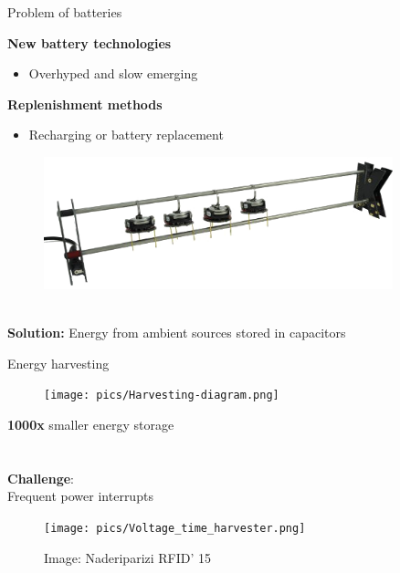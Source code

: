 \documentclass{beamer}
\begin{document}
\begin{frame}{Problem of batteries}
	\begin{minipage}{0.54\textwidth}
		\textbf{New battery technologies}
		\begin{itemize}
			\item Overhyped and slow emerging
		\end{itemize}
		\vspace{0.5em}
		\textbf{Replenishment methods}
		\begin{itemize}
			\item Recharging or battery replacement
		\end{itemize}
	\end{minipage}
	\begin{minipage}{0.45\textwidth}\raggedleft
		\begin{figure}
			\centering
			\includegraphics[width=0.9\textwidth]{pics/Kilobot_charger_with_robots1-495x188.png}
		\end{figure}
	\end{minipage} \\
	\vspace{3em}
	\pause
	\textbf{Solution:} 
	Energy from ambient sources stored in capacitors
\end{frame}

\begin{frame}{Energy harvesting}
	\begin{figure}
		\centering
		\texttt{[image: pics/Harvesting-diagram.png]}
	\end{figure}
	\begin{minipage}{0.45\textwidth}
		\textbf{1000x} smaller energy storage \\\\\\
		\textbf{Challenge}: \\
		Frequent power interrupts
	\end{minipage}
	\begin{minipage}{0.54\textwidth}\raggedleft
		\begin{figure}
			\vspace{2em}
			\texttt{[image: pics/Voltage\_time\_harvester.png]}
			\caption*{Image: Naderiparizi RFID' 15}
		\end{figure}
	\end{minipage}
\end{frame}
\end{document}
